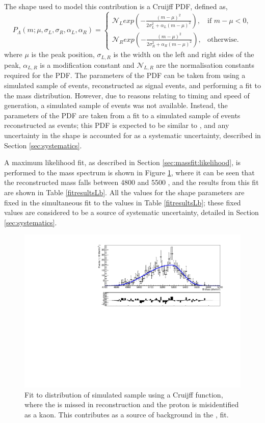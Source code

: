 The shape used to model this  contribution is a Cruijff PDF, defined as,
\begin{equation}
  P_{\Lambda}(m; \mu,\sigma_L,\sigma_R,\alpha_L,\alpha_R)=
\begin{cases}
    \mathcal{N}_{L} exp \left( -\frac{(m-\mu)^2}{2\sigma_L^2 + \alpha_L(m-\mu)^2} \right) ,     & \text{if } m-\mu < 0, \\
    \mathcal{N}_{R} exp \left( -\frac{(m-\mu)^2}{2\sigma_R^2 + \alpha_R(m-\mu)^2} \right) ,     & \text{otherwise.}
\end{cases}
\label{Cruijff}
\end{equation}%
where $\mu$ is the peak position, $\sigma_{L,R}$ is the width on the left and right sides of the peak, $\alpha_{L,R}$ is a modification constant and $\mathcal{N}_{L,R}$ are the normalisation constants required for the PDF. The parameters of the PDF can be taken from using a simulated sample of  events, reconstructed as \decay{\Bm}{\D\Kstarm} signal events, and performing a fit to the \Bm mass distribution. However, due to reasons relating to timing and speed of generation, a simulated sample of  events was not available. Instead, the parameters of the PDF are taken from a fit to a simulated sample of \decay{\Lb}{\Lc\Km} events reconstructed as \decay{\Bm}{\D\Km} events; this PDF is expected to be similar to , and any uncertainty in the shape is accounted for as a systematic uncertainty, described in Section \ref{sec:systematics}.

A maximum likelihood fit, as described in Section \ref{sec:massfit:likelihood}, is performed to the \Bm mass spectrum is shown in Figure \ref{Lbfit}, where it can be seen that the reconstructed \Bm mass falls between 4800 and 5500 \mevcc, and the results from this fit are shown in Table \ref{fitresultsLb}. All the values for the shape parameters are fixed in the simultaneous fit to the values in Table \ref{fitresultsLb}; these fixed values are considered to be a source of systematic uncertainty, detailed in Section \ref{sec:systematics}. 

\begin{figure}[h]
\centering
\includegraphics[width=0.7\linewidth]{figures/backgrounds/Lb2LcKst.pdf}
\caption{Fit to distribution of simulated  sample using a Cruijff function, where the \pip is missed in reconstruction and the proton is misidentified as a kaon. This contributes as a source of background in the \decay{\Bm}{\D\Kstarm}, \decay{\D}{\Kp\Km} fit.}
\label{Lbfit}
\end{figure}

